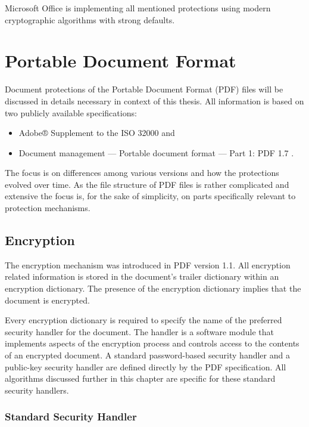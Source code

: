 \documentclass[11pt,oneside]{fithesis2}
\begin{document}
Microsoft Office is implementing all mentioned protections using modern cryptographic algorithms with strong defaults. 

\chapter{Portable Document Format}\label{ch_pdf}

Document protections of the Portable Document Format (PDF) files will be discussed in details necessary in context of this thesis. All information is based on two publicly available specifications:

\begin{itemize}
\setlength\itemsep{0.1em}
\item{Adobe® Supplement to the ISO 32000 \cite{iso32000sup} and}
\item{Document management — Portable document format — Part 1: PDF 1.7 \cite{pdf_spec}.}
\end{itemize}

The focus is on differences among various versions and how the protections evolved over time. As the file structure of PDF files is rather complicated and extensive the focus is, for the sake of simplicity, on parts specifically relevant to protection mechanisms.

\section{Encryption}

The encryption mechanism was introduced in PDF version 1.1. All encryption related information is stored in the document's trailer dictionary \cite[p. 42]{pdf_spec} within an encryption dictionary. The presence of the encryption dictionary implies that the document is encrypted.

Every encryption dictionary is required to specify the name of the preferred security handler for the document. The handler is a software module that implements aspects of the encryption process and controls access to the contents of an encrypted document. A standard password-based security handler and a public-key security handler are defined directly by the PDF specification. All algorithms discussed further in this chapter are specific for these standard security handlers.

\subsection{Standard Security Handler}\label{pdf_enc}
\end{document}
